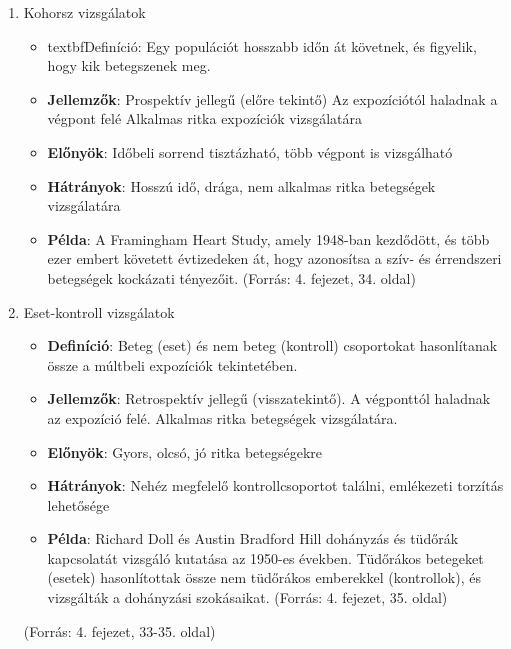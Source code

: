 \documentclass[a4paper,12pt]{article}
\begin{document}
\begin{enumerate}[label=(\alph*)]
    
    \item Kohorsz vizsgálatok

\begin{itemize}
\item textbf{Definíció}: Egy populációt hosszabb időn át követnek, és figyelik, hogy kik betegszenek meg.  

\item \textbf{Jellemzők}: Prospektív jellegű (előre tekintő)
Az expozíciótól haladnak a végpont felé
Alkalmas ritka expozíciók vizsgálatára    

\item  \textbf{Előnyök}: Időbeli sorrend tisztázható, több végpont is vizsgálható    

\item \textbf{Hátrányok}: Hosszú idő, drága, nem alkalmas ritka betegségek vizsgálatára

\item \textbf{Példa}: A Framingham Heart Study, amely 1948-ban kezdődött, és több ezer embert követett évtizedeken át, hogy azonosítsa a szív- és érrendszeri betegségek kockázati tényezőit. (Forrás: 4. fejezet, 34. oldal)
\end{itemize}

    \item Eset-kontroll vizsgálatok
\begin{itemize}

\item \textbf{Definíció}: Beteg (eset) és nem beteg (kontroll) csoportokat hasonlítanak össze a múltbeli expozíciók tekintetében.

\item \textbf{Jellemzők}: Retrospektív jellegű (visszatekintő). A végponttól haladnak az expozíció felé. Alkalmas ritka betegségek vizsgálatára.


\item \textbf{Előnyök}: Gyors, olcsó, jó ritka betegségekre

\item \textbf{Hátrányok}: Nehéz megfelelő kontrollcsoportot találni, emlékezeti torzítás lehetősége
 
\item \textbf{Példa}: Richard Doll és Austin Bradford Hill dohányzás és tüdőrák kapcsolatát vizsgáló kutatása az 1950-es években. Tüdőrákos betegeket (esetek) hasonlítottak össze nem tüdőrákos emberekkel (kontrollok), és vizsgálták a dohányzási szokásaikat. (Forrás: 4. fejezet, 35. oldal) 
   
\end{itemize}
(Forrás: 4. fejezet, 33-35. oldal)

 \end{enumerate}
\end{document}
